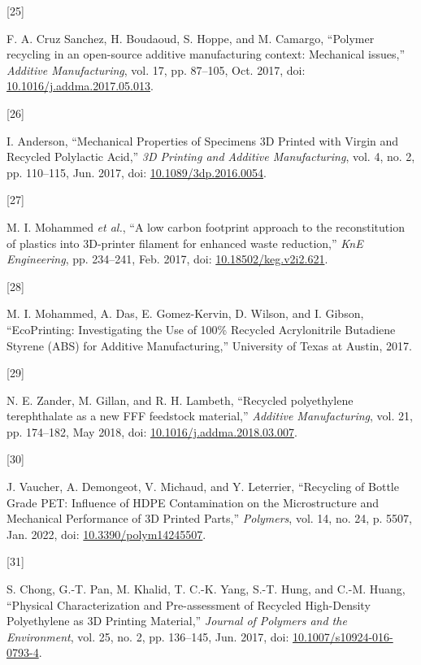 \documentclass[
]{article}
\newlength{\cslhangindent}
\newlength{\csllabelwidth}
\newlength{\cslentryspacingunit} %
\newenvironment{CSLReferences}[2] %
 {%
  \setlength{\parindent}{0pt}
  \ifodd #1
  \let\oldpar\par
  \def\par{\hangindent=\cslhangindent\oldpar}
  \fi
  \setlength{\parskip}{#2\cslentryspacingunit}
 }%
 {}
\newcommand{\CSLLeftMargin}[1]{\parbox[t]{\csllabelwidth}{#1}}
\newcommand{\CSLRightInline}[1]{\parbox[t]{\linewidth - \csllabelwidth}{#1}\break}
\begin{document}
\begin{CSLReferences}{0}{0}
\leavevmode{}%
\CSLLeftMargin{{[}25{]} }%
\CSLRightInline{F. A. Cruz Sanchez, H. Boudaoud, S. Hoppe, and M.
Camargo, {``Polymer recycling in an open-source additive manufacturing
context: {Mechanical} issues,''} \emph{Additive Manufacturing}, vol. 17,
pp. 87--105, Oct. 2017, doi:
\href{https://doi.org/10.1016/j.addma.2017.05.013}{10.1016/j.addma.2017.05.013}.}

\leavevmode{}%
\CSLLeftMargin{{[}26{]} }%
\CSLRightInline{I. Anderson, {``Mechanical {Properties} of {Specimens 3D
Printed} with {Virgin} and {Recycled Polylactic Acid},''} \emph{3D
Printing and Additive Manufacturing}, vol. 4, no. 2, pp. 110--115, Jun.
2017, doi:
\href{https://doi.org/10.1089/3dp.2016.0054}{10.1089/3dp.2016.0054}.}

\leavevmode{}%
\CSLLeftMargin{{[}27{]} }%
\CSLRightInline{M. I. Mohammed \emph{et al.}, {``A low carbon footprint
approach to the reconstitution of plastics into {3D-printer} filament
for enhanced waste reduction,''} \emph{KnE Engineering}, pp. 234--241,
Feb. 2017, doi:
\href{https://doi.org/10.18502/keg.v2i2.621}{10.18502/keg.v2i2.621}.}

\leavevmode{}%
\CSLLeftMargin{{[}28{]} }%
\CSLRightInline{M. I. Mohammed, A. Das, E. Gomez-Kervin, D. Wilson, and
I. Gibson, {``{EcoPrinting}: {Investigating} the {Use} of 100\%
{Recycled Acrylonitrile Butadiene Styrene} ({ABS}) for {Additive
Manufacturing},''} {University of Texas at Austin}, 2017.}

\leavevmode{}%
\CSLLeftMargin{{[}29{]} }%
\CSLRightInline{N. E. Zander, M. Gillan, and R. H. Lambeth, {``Recycled
polyethylene terephthalate as a new {FFF} feedstock material,''}
\emph{Additive Manufacturing}, vol. 21, pp. 174--182, May 2018, doi:
\href{https://doi.org/10.1016/j.addma.2018.03.007}{10.1016/j.addma.2018.03.007}.}

\leavevmode{}%
\CSLLeftMargin{{[}30{]} }%
\CSLRightInline{J. Vaucher, A. Demongeot, V. Michaud, and Y. Leterrier,
{``Recycling of {Bottle Grade PET}: {Influence} of {HDPE Contamination}
on the {Microstructure} and {Mechanical Performance} of {3D Printed
Parts},''} \emph{Polymers}, vol. 14, no. 24, p. 5507, Jan. 2022, doi:
\href{https://doi.org/10.3390/polym14245507}{10.3390/polym14245507}.}

\leavevmode{}%
\CSLLeftMargin{{[}31{]} }%
\CSLRightInline{S. Chong, G.-T. Pan, M. Khalid, T. C.-K. Yang, S.-T.
Hung, and C.-M. Huang, {``Physical {Characterization} and
{Pre-assessment} of {Recycled High-Density Polyethylene} as {3D Printing
Material},''} \emph{Journal of Polymers and the Environment}, vol. 25,
no. 2, pp. 136--145, Jun. 2017, doi:
\href{https://doi.org/10.1007/s10924-016-0793-4}{10.1007/s10924-016-0793-4}.}


\end{CSLReferences}
\end{document}

